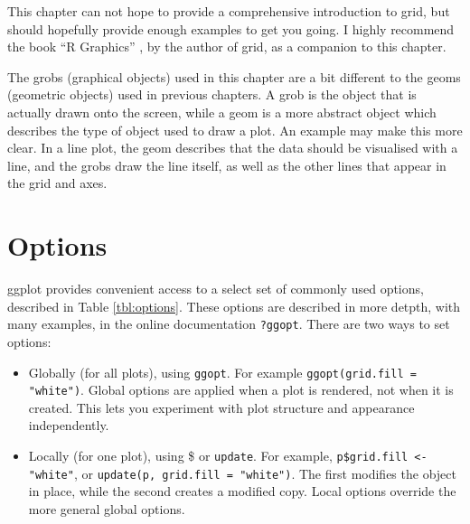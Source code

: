 This chapter can not hope to provide a comprehensive introduction to grid, but should hopefully provide enough examples to get you going.   I highly recommend the book ``R Graphics'' \citep{murrell:2005}, by the author of grid,  as a companion to this chapter.   

The grobs (graphical objects) used in this chapter are a bit different to the geoms (geometric objects) used in previous chapters.  A grob is the object that is actually drawn onto the screen, while a geom is a more abstract object which describes the type of object used to draw a plot.  An example may make this more clear. In a line plot, the geom describes that the data should be visualised with a line, and the grobs draw the line itself, as well as the other lines that appear in the grid and axes.

\section{Options}\label{sec:options}

ggplot provides convenient access to a select set of commonly used options, described in Table \ref{tbl:options}.  These options are described in more detpth, with many examples, in the online documentation {\tt ?ggopt}.
There are two ways to set options:

\begin{itemize}
  \item Globally (for all plots), using {\tt ggopt}.  For example {\tt ggopt(grid.fill = "white")}.   Global options are applied when a plot is rendered, not when it is created.  This lets you experiment with plot structure and appearance independently.

  \item Locally (for one plot), using \$ or {\tt update}.  For example, {\tt p\$grid.fill <- "white"}, or {\tt update(p, grid.fill = "white")}.  The first modifies the object in place, while the second creates a modified copy. Local options override the more general global options.
\end{itemize}     


